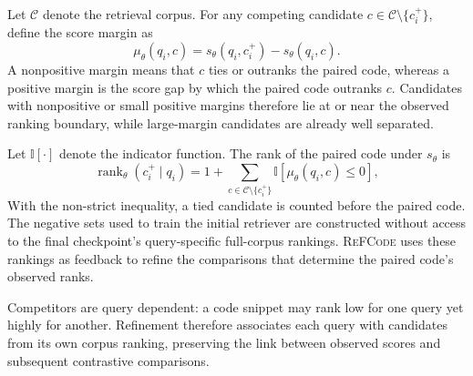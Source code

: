 \documentclass[11pt]{article}
\newcommand{\method}{\textsc{ReFCode}}
\begin{document}
Let \(\mathcal{C}\) denote the retrieval corpus. For any competing candidate \(c\in\mathcal{C}\setminus\{c_i^+\}\), define the score margin as
\begin{equation}
  \mu_\theta(q_i,c)
  =s_\theta(q_i,c_i^+)-s_\theta(q_i,c).
  \label{eq:score_margin}
\end{equation}
A nonpositive margin means that \(c\) ties or outranks the paired code, whereas a positive margin is the score gap by which the paired code outranks \(c\). Candidates with nonpositive or small positive margins therefore lie at or near the observed ranking boundary, while large-margin candidates are already well separated.

Let \(\mathbb{I}[\cdot]\) denote the indicator function. The rank of the paired code under \(s_\theta\) is
\begin{equation}
  \operatorname{rank}_\theta(c_i^+\mid q_i)
  =1+\sum_{c\in\mathcal{C}\setminus\{c_i^+\}}
  \mathbb{I}\!\left[\mu_\theta(q_i,c)\leq 0\right],
  \label{eq:rank_margin}
\end{equation}
With the non-strict inequality, a tied candidate is counted before the paired code. The negative sets used to train the initial retriever are constructed without access to the final checkpoint's query-specific full-corpus rankings. \method{} uses these rankings as feedback to refine the comparisons that determine the paired code's observed ranks.

Competitors are query dependent: a code snippet may rank low for one query yet highly for another. Refinement therefore associates each query with candidates from its own corpus ranking, preserving the link between observed scores and subsequent contrastive comparisons.
\end{document}
